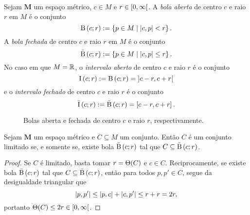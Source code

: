 \begin{definition}
Sejam $\bm M$ um espaço métrico, $c \in M$ e $r \in \left[0,\allowbreak \infty\right[$. A \emph{bola aberta} de centro $c$ e raio $r$ em $M$ é o conjunto
	\begin{equation*}
	\mathrm{B}\left(c; r\right) := \left\{ p \in M \;\middle\vert\; \left\vert{c},{p}\right\vert < r \right\}.
	\end{equation*}
A \emph{bola fechada} de centro $c$ e raio $r$ em $M$ é o conjunto
	\begin{equation*}
	\bar{\mathrm{B}}\left(c; r\right) := \left\{ p \in M \;\middle\vert\; \left\vert{c},{p}\right\vert \leq r \right\}.
	\end{equation*}
No caso em que $M = \mathbb{R}$, o \emph{intervalo aberto} de centro $c$ e raio $r$ é o conjunto
	\begin{equation*}
	\mathrm{I}\left(c; r\right) := \mathrm{B}\left(c; r\right) = \left]c-r,\allowbreak c+r\right[
	\end{equation*}
e o \emph{intervalo fechado} de centro $c$ e raio $r$ é o conjunto
	\begin{equation*}
	\bar{\mathrm{I}}\left(c; r\right) := \bar{\mathrm{B}}\left(c; r\right) = \left[c-r,\allowbreak c+r\right].
	\end{equation*}
\end{definition}

\begin{figure}
\centering
{}\hspace{3cm}
\caption{Bolas aberta e fechada de centro $c$ e raio $r$, respectivamente.}
\end{figure}

\begin{proposition}
\label{prop:criterio.limitacao.bola}
Sejam $\bm M$ um espaço métrico e $C \subseteq M$ um conjunto. Então $C$ é um conjunto limitado se, e somente se, existe bola $\bar{\mathrm{B}}\left(c; r\right)$ tal que $C \subseteq \bar{\mathrm{B}}\left(c; r\right)$.
\end{proposition}
\begin{proof}
Se $C$ é limitado, basta tomar $r=\Theta(C)$ e $c \in C$. Reciprocamente, se existe bola $\bar{\mathrm{B}}\left(c; r\right)$ tal que $C \subseteq \bar{\mathrm{B}}\left(c; r\right)$, então para todos $p,p' \in C$, segue da desigualdade triangular que
	\begin{equation*}
	\left\vert{p},{p'}\right\vert \leq \left\vert{p},{c}\right\vert+\left\vert{c},{p'}\right\vert \leq r+r=2r,
	\end{equation*}
portanto $\Theta(C) \leq 2r \in \left[0,\allowbreak \infty\right[$.
\end{proof}

